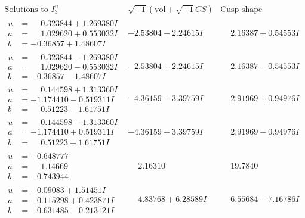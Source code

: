 \documentclass[1p]{elsarticle_modified}
\theoremstyle{definition}
\newcommand{\I}{\sqrt{-1}}
\begin{document}
$$\begin{array}{c|c|c}  
\text{Solutions to }I^u_{3}& \I (\text{vol} + \sqrt{-1}CS) & \text{Cusp shape}\\
 \hline 
\begin{aligned}
u &= \phantom{-}0.323844 + 1.269380 I \\
a &= \phantom{-}1.029620 + 0.553032 I \\
b &= -0.36857 + 1.48607 I\end{aligned}
 & -2.53804 - 2.24615 I & \phantom{-}2.16387 + 0.54553 I \\ \hline\begin{aligned}
u &= \phantom{-}0.323844 - 1.269380 I \\
a &= \phantom{-}1.029620 - 0.553032 I \\
b &= -0.36857 - 1.48607 I\end{aligned}
 & -2.53804 + 2.24615 I & \phantom{-}2.16387 - 0.54553 I \\ \hline\begin{aligned}
u &= \phantom{-}0.144598 + 1.313360 I \\
a &= -1.174410 - 0.519311 I \\
b &= \phantom{-}0.51223 - 1.61751 I\end{aligned}
 & -4.36159 - 3.39759 I & \phantom{-}2.91969 + 0.94976 I \\ \hline\begin{aligned}
u &= \phantom{-}0.144598 - 1.313360 I \\
a &= -1.174410 + 0.519311 I \\
b &= \phantom{-}0.51223 + 1.61751 I\end{aligned}
 & -4.36159 + 3.39759 I & \phantom{-}2.91969 - 0.94976 I \\ \hline\begin{aligned}
u &= -0.648777\phantom{ +0.000000I} \\
a &= \phantom{-}1.14669\phantom{ +0.000000I} \\
b &= -0.743944\phantom{ +0.000000I}\end{aligned}
 & \phantom{-}2.16310\phantom{ +0.000000I} & \phantom{-}19.7840\phantom{ +0.000000I} \\ \hline\begin{aligned}
u &= -0.09083 + 1.51451 I \\
a &= -0.115298 + 0.423871 I \\
b &= -0.631485 - 0.213121 I\end{aligned}
 & \phantom{-}4.83768 + 6.28589 I & \phantom{-}6.55684 - 7.16786 I \\ \hline\begin{aligned}

\end{aligned}
\end{array}$$
\end{document}
